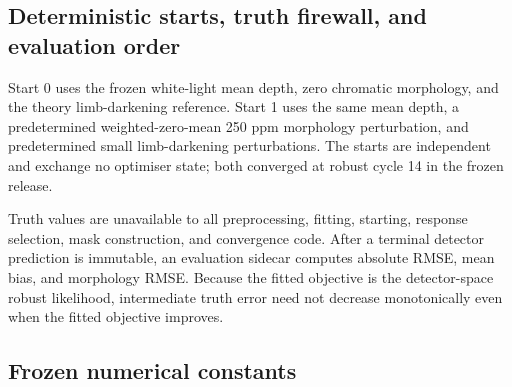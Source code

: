 \subsection{Deterministic starts, truth firewall, and evaluation order}

Start 0 uses the frozen white-light mean depth, zero chromatic morphology,
and the theory limb-darkening reference. Start 1 uses the same mean depth, a
predetermined weighted-zero-mean 250 ppm morphology perturbation, and
predetermined small limb-darkening perturbations. The starts are independent
and exchange no optimiser state; both converged at robust cycle 14 in the
frozen release.

Truth values are unavailable to all preprocessing, fitting, starting,
response selection, mask construction, and convergence code. After a
terminal detector prediction is immutable, an evaluation sidecar computes
absolute RMSE, mean bias, and morphology RMSE. Because the fitted objective
is the detector-space robust likelihood, intermediate truth error need not
decrease monotonically even when the fitted objective improves.

\subsection{Frozen numerical constants}

